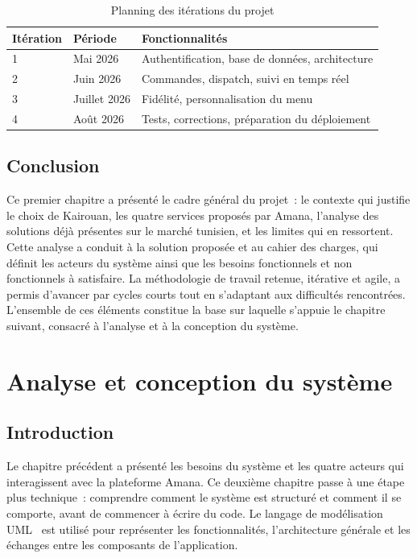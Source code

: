 \documentclass[12pt,fleqn,a4paper]{report}
\begin{document}
\begin{justify}
\begin{table}[H]
\centering
\begin{tabular}{|l|l|l|}
\hline
\textbf{Itération} & \textbf{Période} & \textbf{Fonctionnalités} \\
\hline
1 & Mai 2026 & Authentification, base de données, architecture \\
2 & Juin 2026 & Commandes, dispatch, suivi en temps réel \\
3 & Juillet 2026 & Fidélité, personnalisation du menu \\
4 & Août 2026 & Tests, corrections, préparation du déploiement \\
\hline
\end{tabular}
\caption{Planning des itérations du projet}
\end{table}

\section{Conclusion}

Ce premier chapitre a présenté le cadre général du projet~: le contexte qui justifie le choix de Kairouan, les quatre services proposés par Amana, l'analyse des solutions déjà présentes sur le marché tunisien, et les limites qui en ressortent. Cette analyse a conduit à la solution proposée et au cahier des charges, qui définit les acteurs du système ainsi que les besoins fonctionnels et non fonctionnels à satisfaire. La méthodologie de travail retenue, itérative et agile, a permis d'avancer par cycles courts tout en s'adaptant aux difficultés rencontrées. L'ensemble de ces éléments constitue la base sur laquelle s'appuie le chapitre suivant, consacré à l'analyse et à la conception du système.

\chapter{Analyse et conception du système}

\section{Introduction}

Le chapitre précédent a présenté les besoins du système et les quatre acteurs qui interagissent avec la plateforme Amana. Ce deuxième chapitre passe à une étape plus technique~: comprendre comment le système est structuré et comment il se comporte, avant de commencer à écrire du code. Le langage de modélisation UML~\cite{omg_uml} est utilisé pour représenter les fonctionnalités, l'architecture générale et les échanges entre les composants de l'application.


\end{justify}
\end{document}

